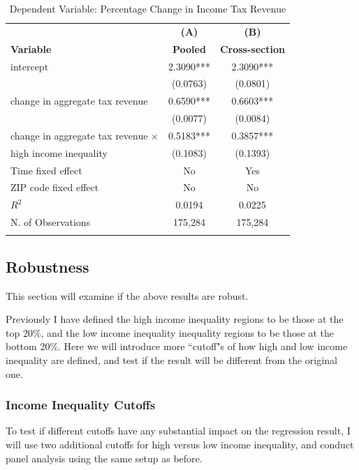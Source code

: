 \documentclass{article}
\begin{document}
\begin{table}[htbp]\centering
\renewcommand\thetable{5.12}
\caption{Dependent Variable: Percentage Change in Income Tax Revenue}
\begin{tabular}{l c c}
\toprule
\textbf{} & \textbf{(A)} & \textbf{(B)} \\ 
\textbf{Variable} & \textbf{Pooled} & \textbf{Cross-section} \\
\midrule
intercept                          &       2.3090*** &  2.3090***  \\
                                   &      (0.0763)   & (0.0801)    \\
change in aggregate tax revenue    &       0.6590*** &  0.6603***  \\
                                   &      (0.0077)   & (0.0084)    \\
change in aggregate tax revenue $\times$        &       0.5183*** &  0.3857***     \\
{         high income inequality}  &      (0.1083)   & (0.1393)    \\
\midrule
Time fixed effect                  &       No        &  Yes        \\
ZIP code fixed effect              &       No        &  No         \\
\midrule
\textbf{$R^2$}                     &       0.0194    &  0.0225     \\
N. of Observations                 &       175,284   &  175,284    \\         
\bottomrule
\addlinespace[1ex]
\multicolumn{3}{l}{\textsuperscript{***}$p<0.01$, 
  \textsuperscript{**}$p<0.05$, 
  \textsuperscript{*}$p<0.1$}
\end{tabular}
\end{table}
\pagebreak


\subsection{Robustness}
This section will examine if the above results are robust.

Previously I have defined the high income inequality regions to be those at the top 20\%, and the low income inequality inequality regions to be those at the bottom 20\%. Here we will introduce more ``cutoff"s of how high and low income inequality are defined, and test if the result will be different from the original one. 

\subsubsection{Income Inequality Cutoffs}
To test if different cutoffs have any substantial impact on the regression result, I will use two additional cutoffs for high versus low income inequality, and conduct panel analysis using the same setup as before. 
\end{document}
